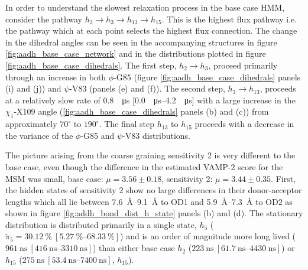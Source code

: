  In order to understand the slowest  relaxation process in the base case HMM, consider the pathway $h_{2}\rightarrow h_{3} \rightarrow h_{13} \rightarrow h_{15}$. This is the highest flux pathway i.e. the pathway which at each point selects the highest flux connection. The change in the dihedral angles can be seen in the accompanying structures in figure \ref{fig:aadh_base_case_network} and in the distributions plotted in figure \ref{fig:aadh_base_case_dihedrals}.
 The first step, $h_2 \rightarrow h_{3}$, proceed primarily through an increase in both $\phi$-G85 (figure \ref{fig:aadh_base_case_dihedrals} panels (i) and (j)) and $\psi$-V83 (panels (e) and (f)). The second step, $h_{3} \rightarrow h_{13}$, proceeds at a relatively slow rate of  \SI{0.8}{\per\micro\second} [\SIrange[range-phrase=--]{0.0}{4.2}{\per\micro\second}] with a large increase in the $\chi_1$-X109 angle (\ref{fig:aadh_base_case_dihedrals} panels (b) and (c)) from approximately $70^{\circ}$ to $190^{\circ}$. The final step $h_{13}$ to $h_{15}$ proceeds with a decrease in the variance of the $\phi$-G85 and $\psi$-V83 distributions.


The picture arising from the coarse graining sensitivity 2 is very different to the base case, even though the difference in the estimated VAMP-2 score for the MSM was small, base case: $\mu=3.56 \pm 0.18$, sensitivity 2: $\mu=3.44 \pm 0.35$.   First, the hidden states of sensitivity 2 show no large differences in their donor-acceptor lengths which all lie between \SIrange[range-phrase=--]{7.6}{9.1}{\angstrom} to OD1 and \SIrange[range-phrase=--]{5.9}{7.3}{\angstrom} to OD2 as shown in figure \ref{fig:addh_bond_dist_h_state} panels (b) and (d). The stationary distribution is distributed primarily in a single state, $h_{5}$ ($\tilde{\pi}_{5} = \SI{30.12}{\percent}\ [\SIrange[range-phrase=--]{5.27}{68.33}{\percent}]$) and is an order of magnitude more long lived ($\SI{961}{\nano\second}\ [\SIrange[range-phrase=--]{416}{3310}{\nano\second}]$) than either base case $h_{2}$ ($\SI{223}{\nano\second}\ [\SIrange[range-phrase=--]{61.7}{4430}{\nano\second}]$) or $h_{15}$ ($\SI{275}{\nano\second}\ [\SIrange[range-phrase=--]{53.4}{7400}{\nano\second}]$, $h_{15}$). 


